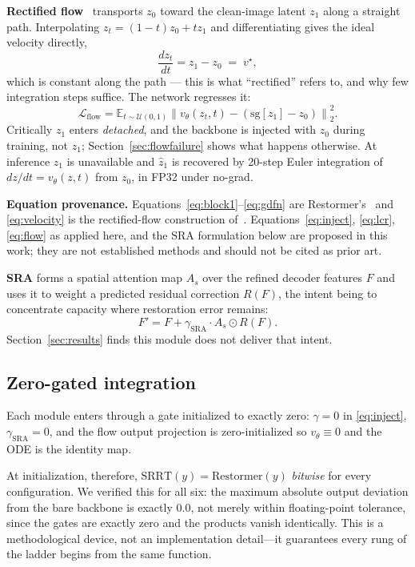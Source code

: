 \documentclass[conference]{IEEEtran}
\newcommand{\bs}[1]{\textbf{#1}}
\begin{document}
\bs{Rectified flow}~\cite{rectifiedflow} transports $z_0$ toward the
clean-image latent $z_1$ along a straight path. Interpolating
$z_t=(1-t)z_0+tz_1$ and differentiating gives the ideal velocity directly,
\begin{equation}
\frac{dz_t}{dt} = z_1 - z_0 \;=\; v^\star ,
\label{eq:velocity}
\end{equation}
which is constant along the path --- this is what ``rectified'' refers to, and
why few integration steps suffice. The network regresses it:
\begin{equation}
\mathcal{L}_{\text{flow}} = \mathbb{E}_{t\sim\mathcal{U}(0,1)}
\left\| v_\theta(z_t,t) - (\mathrm{sg}[z_1] - z_0) \right\|_2^2 .
\label{eq:flow}
\end{equation}
Critically $z_1$ enters \emph{detached}, and the backbone is injected with
$z_0$ during training, not $z_1$; Section~\ref{sec:flowfailure} shows what
happens otherwise. At inference $z_1$ is unavailable and $\hat{z}_1$ is
recovered by 20-step Euler integration of $dz/dt=v_\theta(z,t)$ from $z_0$,
in FP32 under no-grad.

\bs{Equation provenance.} Equations~\eqref{eq:block1}--\eqref{eq:gdfn} are
Restormer's~\cite{restormer} and \eqref{eq:velocity} is the rectified-flow
construction of~\cite{rectifiedflow}. Equations~\eqref{eq:inject},
\eqref{eq:lcr}, \eqref{eq:flow} as applied here, and the SRA formulation below
are proposed in this work; they are not established methods and should not be
cited as prior art.

\bs{SRA} forms a spatial attention map $A_s$ over the refined decoder features
$F$ and uses it to weight a predicted residual correction $R(F)$, the intent
being to concentrate capacity where restoration error remains:
\begin{equation}
F' = F + \gamma_{\text{SRA}}\cdot A_s \odot R(F).
\label{eq:sra}
\end{equation}
Section~\ref{sec:results} finds this module does not deliver that intent.

\subsection{Zero-gated integration}
\label{sec:zerogatemethod}
Each module enters through a gate initialized to exactly zero: $\gamma=0$ in
\eqref{eq:inject}, $\gamma_{\text{SRA}}=0$, and the flow output projection is
zero-initialized so $v_\theta\equiv 0$ and the ODE is the identity map.

At initialization, therefore, $\mathrm{SRRT}(y)=\mathrm{Restormer}(y)$
\emph{bitwise} for every configuration. We verified this for all six: the
maximum absolute output deviation from the bare backbone is exactly $0.0$, not
merely within floating-point tolerance, since the gates are exactly zero and
the products vanish identically. This is a methodological device, not an
implementation detail---it guarantees every rung of the ladder begins from the
same function.
\end{document}
